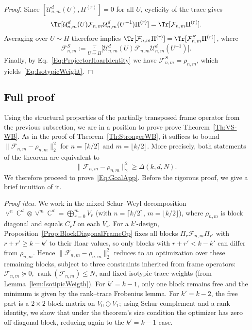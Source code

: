 \documentclass[aps,twocolumn,pra,superscriptaddress,nofootinbib]{revtex4-2}
\DeclareMathOperator{\C}{\mathbb{C}} %
\begin{document}
\begin{proof}
Since $[\mathcal U_{n,m}^{d}(U),\Pi^{(r)}]=0$ for all $U$, cyclicity of the trace gives
\[
\Tr[\mathcal U_{n,m}^{d}(U)\mathcal F_{n,m}\mathcal U_{n,m}^{d}(U^{-1})\Pi^{(r)}]
=
\Tr[\mathcal F_{n,m}\Pi^{(r)}].
\]
Averaging over $U\sim H$ therefore implies
$\Tr[\mathcal F_{n,m}\Pi^{(r)}]=\Tr[\mathcal F_{n,m}^{S}\Pi^{(r)}]$, where
\[
\mathcal F_{n,m}^{S}
:=
\underset{U\sim H}{\mathbb{E}}
\bigl[\mathcal U_{n,m}^{d}(U)\mathcal F_{n,m}\mathcal U_{n,m}^{d}(U^{-1})\bigr].
\]
Finally, by Eq.~\eqref{Eq:ProjectorHaarIdentity} we have $\mathcal F_{n,m}^{S}=\rho_{n,m}$, which yields~\eqref{Eq:IsotypicWeight}. 
\end{proof}




\subsection{Full proof}


Using the structural properties of the partially transposed frame operator from the previous subsection, we are in a position to prove prove Theorem~\ref{Th:VS-WB}. As in the proof of Theorem~\ref{Th:StrongerWB}, it suffices to bound
$\|\mathcal F_{n,m}-\rho_{n,m}\|_2^2$ for $n=\lceil k/2\rceil$ and $m=\lfloor k/2\rfloor$. More precisely, both
statements of the theorem are equivalent to
\begin{equation}\label{Eq:GoalApp}
\boxed{\|\mathcal F_{n,m}-\rho_{n,m}\|_2^2 \ge \Delta(k,d,N).}
\end{equation}
We therefore proceed to prove~\eqref{Eq:GoalApp}.
Before the rigorous proof, we give a brief intuition of it. 

\textit{Proof idea.} 
We work in the mixed Schur--Weyl decomposition
$\vee^n\C^d\otimes \vee^{m}\C^d=\bigoplus_{r=0}^{m}V_r$ (with $n=\lceil k/2\rceil$, $m=\lfloor k/2\rfloor$), where
$\rho_{n,m}$ is block diagonal and equals $C_r I$ on each $V_r$.
For a $k'$-design, Proposition~\ref{Prop:BlockDiagonalFrameOp} fixes all blocks
$\Pi_r\mathcal F_{n,m}\Pi_{r'}$ with $r+r'\ge k-k'$ to their Haar values, so only blocks with
$r+r'<k-k'$ can differ from $\rho_{n,m}$.
Hence $\|\mathcal F_{n,m}-\rho_{n,m}\|_2^2$ reduces to an optimization over these remaining blocks,
subject to three constraints inherited from frame operators:
$\mathcal F_{n,m}\succeq 0$, $\operatorname{rank}(\mathcal F_{n,m})\le N$, and fixed isotypic trace weights
(from Lemma~\ref{lem:IsotipicWeigth}).
For $k'=k-1$, only one block remains free and the minimum is given by the rank--trace Frobenius lemma.
For $k'=k-2$, the free part is a $2\times2$ block matrix on $V_0\oplus V_1$; using Schur complement and
a rank identity, we show that under the theorem's size condition the optimizer has zero off-diagonal block,
reducing again to the $k'=k-1$ case.
\end{document}
